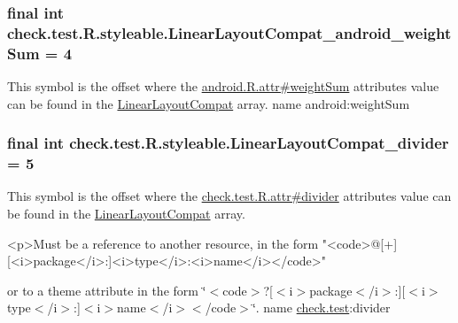 \subsubsection[{Linear\+Layout\+Compat\+\_\+android\+\_\+weight\+Sum}]{\setlength{\rightskip}{0pt plus 5cm}final int check.\+test.\+R.\+styleable.\+Linear\+Layout\+Compat\+\_\+android\+\_\+weight\+Sum = 4\hspace{0.3cm}{\ttfamily [static]}}\label{classcheck_1_1test_1_1_r_1_1styleable_ae245bae0548f5ad66ca9cf0a1cdb45b4}
This symbol is the offset where the \hyperlink{}{android.\+R.\+attr\#weight\+Sum} attribute\textquotesingle{}s value can be found in the \hyperlink{classcheck_1_1test_1_1_r_1_1styleable_a1cee5a37a541e5cb360983f35ebfe0fc}{Linear\+Layout\+Compat} array.  name android\+:weight\+Sum \hypertarget{classcheck_1_1test_1_1_r_1_1styleable_ac11ca4a97787af8e1f1d162edcc0c436}{}
\subsubsection[{Linear\+Layout\+Compat\+\_\+divider}]{\setlength{\rightskip}{0pt plus 5cm}final int check.\+test.\+R.\+styleable.\+Linear\+Layout\+Compat\+\_\+divider = 5\hspace{0.3cm}{\ttfamily [static]}}\label{classcheck_1_1test_1_1_r_1_1styleable_ac11ca4a97787af8e1f1d162edcc0c436}
This symbol is the offset where the \hyperlink{classcheck_1_1test_1_1_r_1_1attr_abda5d171fa2d828b6f8ccf9f4fc707ea}{check.\+test.\+R.\+attr\#divider} attribute\textquotesingle{}s value can be found in the \hyperlink{classcheck_1_1test_1_1_r_1_1styleable_a1cee5a37a541e5cb360983f35ebfe0fc}{Linear\+Layout\+Compat} array.

\begin{DoxyVerb}      <p>Must be a reference to another resource, in the form "<code>@[+][<i>package</i>:]<i>type</i>:<i>name</i></code>"
\end{DoxyVerb}
 or to a theme attribute in the form \char`\"{}$<$code$>$?\mbox{[}$<$i$>$package$<$/i$>$\+:\mbox{]}\mbox{[}$<$i$>$type$<$/i$>$\+:\mbox{]}$<$i$>$name$<$/i$>$$<$/code$>$\char`\"{}.  name \hyperlink{namespacecheck_1_1test}{check.\+test}\+:divider \hypertarget{classcheck_1_1test_1_1_r_1_1styleable_afdc801825abf8606d597921106733dda}{}
